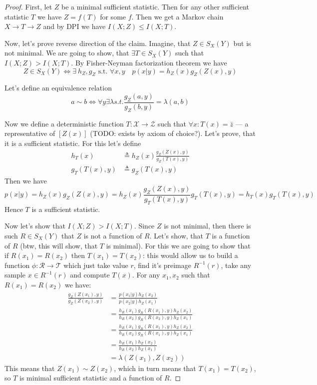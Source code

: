 \documentclass{article}
\begin{document}
\begin{proof}
First, let $Z$ be a minimal sufficient statistic.
Then for any other sufficient statistic $T$ we have $Z = f(T)$ for some $f$.
Then we get a Markov chain $X \to T \to Z$ and by DPI we have $I(X;Z) \leq I(X;T)$.

Now, let's prove reverse direction of the claim.
Imagine, that $Z \in S_X(Y)$ but is not minimal.
We are going to show, that $\exists T \in S_X(Y)$ such that $I(X;Z) > I(X;T)$.
By Fisher-Neyman factorization theorem we have
\[
Z \in S_X(Y) \Longleftrightarrow \exists\ h_Z, g_Z \text{ s.t. } \forall x,y \quad p(x|y) = h_Z(x) g_Z(Z(x), y)
\]

Let's define an equivalence relation
\[
a \sim b \Longleftrightarrow \forall y \exists \lambda s.t. \frac{g_Z(a, y)}{g_Z(b, y)} = \lambda(a, b)
\]

Now we define a deterministic function $T:\mathcal{X} \to \mathcal{Z}$ such that $\forall x: T(x) = \bar{z}$ --- a representative of $[Z(x)]$ (TODO: exists by axiom of choice?).
Let's prove, that it is a sufficient statistic.
For this let's define
\[
\begin{split}
h_T(x) &\triangleq h_Z(x) \frac{g_Z(Z(x), y)}{g_Z(T(x), y)} \\
g_T(T(x), y) &\triangleq g_Z(T(x), y)
\end{split}
\]
Then we have
\[
p(x|y) = h_Z(x) g_Z(Z(x), y) = h_Z(x) \frac{g_Z(Z(x), y)}{g_T(T(x), y)} g_T(T(x), y) = h_T(x) g_T(T(x), y)
\]
Hence $T$ is a sufficient statistic.

Now let's show that $I(X;Z) > I(X;T)$.
Since $Z$ is not minimal, then there is such $R \in S_X(Y)$ that $Z$ is not a function of $R$.
Let's show, that $T$ is a function of $R$ (btw, this will show, that $T$ is minimal).
For this we are going to show that if $R(x_1) = R(x_2)$ then $T(x_1) = T(x_2)$: this would allow us to build a function $\phi:\mathcal{R} \to \mathcal{T}$ which just take value $r$, find it's preimage $R^{-1}(r)$, take any sample $x \in R^{-1}(r)$ and compute $T(x)$.
For any $x_1, x_2$ such that $R(x_1) = R(x_2)$ we have:
\[
\begin{split}
\frac{g_Z(Z(x_1), y)}{g_Z(Z(x_2), y)}
&= \frac{p(x_1 | y) h_Z(x_2)}{p(x_2 | y) h_Z(x_1)} \\
&= \frac{h_R(x_1) g_R(R(x_1), y) h_Z(x_2)}{h_R(x_2) g_R(R(x_2), y) h_Z(x_1)} \\
&= \frac{h_R(x_1) g_R(R(x_1), y) h_Z(x_2)}{h_R(x_2) g_R(R(x_1), y) h_Z(x_1)} \\
&= \frac{h_R(x_1) h_Z(x_2)}{h_R(x_2) h_Z(x_1)} \\
&= \lambda(Z(x_1), Z(x_2))
\end{split}
\]
This means that $Z(x_1) \sim Z(x_2)$, which in turn means that $T(x_1) = T(x_2)$, so $T$ is minimal sufficient statistic and a function of $R$.
\end{proof}
\end{document}
